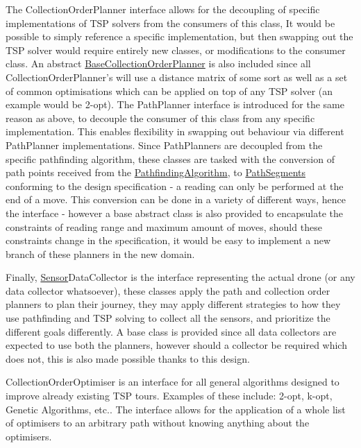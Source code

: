 \documentclass[10pt,a4paper]{article}
\begin{document}
The CollectionOrderPlanner interface allows for the decoupling of specific implementations of TSP solvers from the consumers of this class, It would be possible to simply reference a specific implementation, but then swapping out the TSP solver would require entirely new classes, or modifications to the consumer class.
An abstract \hyperref[tab:BaseCollectionOrderPlanner]{\color{blue}BaseCollectionOrderPlanner} is also included since all CollectionOrderPlanner's will use a distance matrix of some sort as well as a set of common optimisations which can be applied on top of any TSP solver (an example would be 2-opt).
The PathPlanner interface is introduced for the same reason as above, to decouple the consumer of this class from any specific implementation. This enables flexibility in swapping out behaviour via different PathPlanner implementations.
Since PathPlanners are decoupled from the specific pathfinding algorithm, these classes are tasked with the conversion of path points received from the \hyperref[tab:PathfindingAlgorithm]{\color{blue}PathfindingAlgorithm}, to \hyperref[tab:PathSegment]{\color{blue}PathSegments} conforming to the design specification - a reading can only be performed at the end of a move.
This conversion can be done in a variety of different ways, hence the interface - however a base abstract class is also provided to encapsulate the constraints of reading range and maximum amount of moves, should these constraints change in the specification, it would be easy to implement a new branch of these planners in the new domain.

Finally, \hyperref[tab:Sensor]{\color{blue}Sensor}DataCollector is the interface representing the actual drone (or any data collector whatsoever), these classes apply the path and collection order planners to plan their journey, they may apply different strategies to how they use pathfinding and TSP solving to collect all the sensors, and prioritize the different goals differently.
A base class is provided since all data collectors are expected to use both the planners, however should a collector be required which does not, this is also made possible thanks to this design.

CollectionOrderOptimiser is an interface for all general algorithms designed to improve already existing TSP tours. Examples of these include: 2-opt, k-opt, Genetic Algorithms, etc..
The interface allows for the application of a whole list of optimisers to an arbitrary path without knowing anything about the optimisers. 
\end{document}
